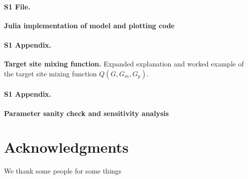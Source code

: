 \documentclass[10pt,letterpaper]{article}
\begin{document}
\paragraph*{S1 File.}
\label{S1_File}
{\bf Julia implementation of model and plotting code}  

\paragraph*{S1 Appendix.}
\label{S1_Appendix}
{\bf Target site mixing function.} 
Expanded explanation and worked example of the target site mixing function $Q(G, G_m, G_p)$.

\paragraph*{S1 Appendix.}
\label{S2_Appendix}
{\bf Parameter sanity check and sensitivity analysis} 

\section*{Acknowledgments}
We thank some people for some things

\nolinenumbers

%
% 
%




% 

\end{document}
